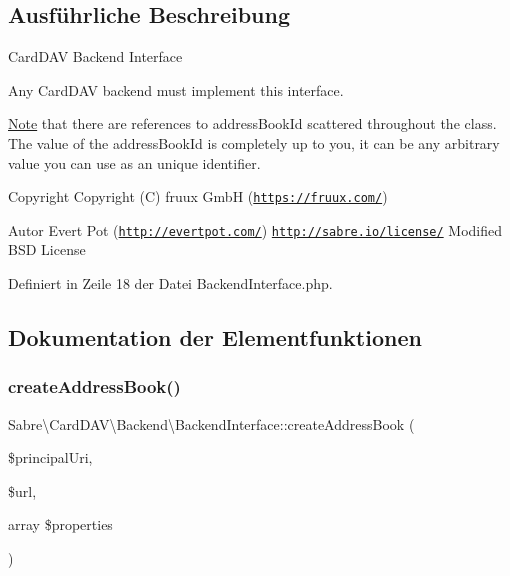 \subsection{Ausführliche Beschreibung}
Card\+D\+AV Backend Interface

Any Card\+D\+AV backend must implement this interface.

\mbox{\hyperlink{class_note}{Note}} that there are references to \textquotesingle{}address\+Book\+Id\textquotesingle{} scattered throughout the class. The value of the address\+Book\+Id is completely up to you, it can be any arbitrary value you can use as an unique identifier.

\begin{DoxyCopyright}{Copyright}
Copyright (C) fruux GmbH (\href{https://fruux.com/}{\tt https\+://fruux.\+com/}) 
\end{DoxyCopyright}
\begin{DoxyAuthor}{Autor}
Evert Pot (\href{http://evertpot.com/}{\tt http\+://evertpot.\+com/})  \href{http://sabre.io/license/}{\tt http\+://sabre.\+io/license/} Modified B\+SD License 
\end{DoxyAuthor}


Definiert in Zeile 18 der Datei Backend\+Interface.\+php.



\subsection{Dokumentation der Elementfunktionen}
\mbox{\label{interface_sabre_1_1_card_d_a_v_1_1_backend_1_1_backend_interface_a448b1c8ec1f0daaaa301bbc8e94ca32a}} 
\subsubsection{\texorpdfstring{create\+Address\+Book()}{createAddressBook()}}
{\footnotesize\ttfamily Sabre\textbackslash{}\+Card\+D\+A\+V\textbackslash{}\+Backend\textbackslash{}\+Backend\+Interface\+::create\+Address\+Book (\begin{DoxyParamCaption}\item[{}]{\$principal\+Uri,  }\item[{}]{\$url,  }\item[{array}]{\$properties }\end{DoxyParamCaption})}

